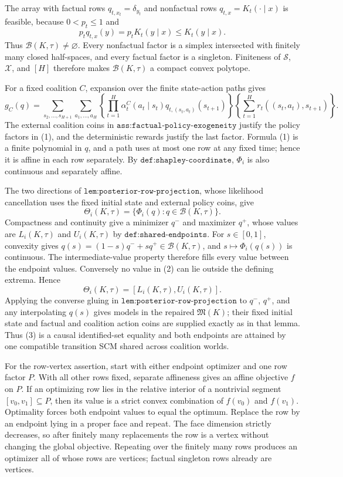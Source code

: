 The array with factual rows \(q_{t,x_t}=\delta_{y_t}\) and nonfactual rows \(q_{t,x}=K_t(\cdot\mid x)\) is feasible, because \(0<p_t\le1\) and
\[
 p_tq_{t,x}(y)=p_tK_t(y\mid x)\le K_t(y\mid x).
\]
Thus \(\mathcal B(K,\tau)\ne\varnothing\).  Every nonfactual factor is a simplex intersected with finitely many closed half-spaces, and every factual factor is a singleton.  Finiteness of \(\mathcal S\), \(\mathcal X\), and \([H]\) therefore makes \(\mathcal B(K,\tau)\) a compact convex polytope.

For a fixed coalition \(C\), expansion over the finite state-action paths gives
\[
 g_C(q)=\sum_{s_2,\ldots,s_{H+1}}\sum_{a_1,\ldots,a_H}
 \left\{\prod_{t=1}^H\alpha_t^C(a_t\mid s_t)
 q_{t,(s_t,a_t)}(s_{t+1})\right\}
 \left\{\sum_{t=1}^Hr_t((s_t,a_t),s_{t+1})\right\}. \tag{1}
\]
The external coalition coins in \(\texttt{ass:factual-policy-exogeneity}\) justify the policy factors in (1), and the deterministic rewards justify the last factor.  Formula (1) is a finite polynomial in \(q\), and a path uses at most one row at any fixed time; hence it is affine in each row separately.  By \(\texttt{def:shapley-coordinate}\), \(\Phi_i\) is also continuous and separately affine.

The two directions of \(\texttt{lem:posterior-row-projection}\), whose likelihood cancellation uses the fixed initial state and external policy coins, give
\[
 \Theta_i(K,\tau)=\{\Phi_i(q):q\in\mathcal B(K,\tau)\}. \tag{2}
\]
Compactness and continuity give a minimizer \(q^-\) and maximizer \(q^+\), whose values are \(L_i(K,\tau)\) and \(U_i(K,\tau)\) by \(\texttt{def:shared-endpoints}\).  For \(s\in[0,1]\), convexity gives \(q(s)=(1-s)q^-+sq^+\in\mathcal B(K,\tau)\), and \(s\mapsto\Phi_i(q(s))\) is continuous.  The intermediate-value property therefore fills every value between the endpoint values.  Conversely no value in (2) can lie outside the defining extrema.  Hence
\[
 \Theta_i(K,\tau)=[L_i(K,\tau),U_i(K,\tau)]. \tag{3}
\]
Applying the converse gluing in \(\texttt{lem:posterior-row-projection}\) to \(q^-\), \(q^+\), and any interpolating \(q(s)\) gives models in the repaired \(\mathfrak M(K)\); their fixed initial state and factual and coalition action coins are supplied exactly as in that lemma.  Thus (3) is a causal identified-set equality and both endpoints are attained by one compatible transition SCM shared across coalition worlds.

For the row-vertex assertion, start with either endpoint optimizer and one row factor \(P\).  With all other rows fixed, separate affineness gives an affine objective \(f\) on \(P\).  If an optimizing row lies in the relative interior of a nontrivial segment \([v_0,v_1]\subseteq P\), then its value is a strict convex combination of \(f(v_0)\) and \(f(v_1)\).  Optimality forces both endpoint values to equal the optimum.  Replace the row by an endpoint lying in a proper face and repeat.  The face dimension strictly decreases, so after finitely many replacements the row is a vertex without changing the global objective.  Repeating over the finitely many rows produces an optimizer all of whose rows are vertices; factual singleton rows already are vertices.

